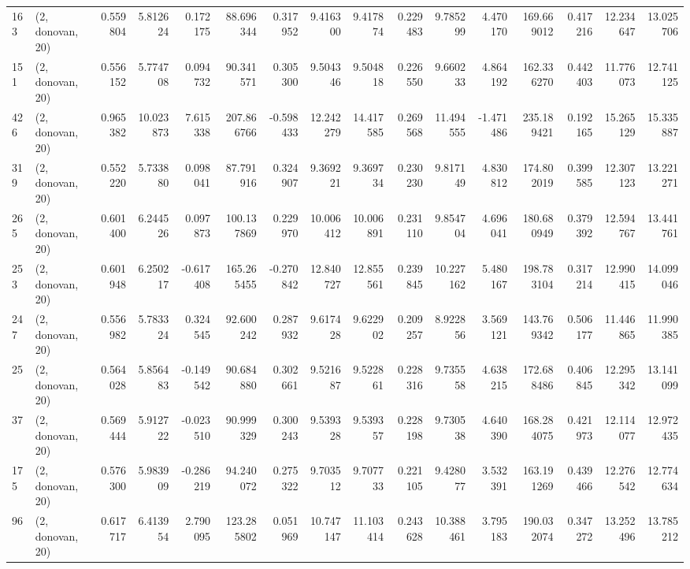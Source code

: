 \begin{tabular}{llrrrrrrrrrrrrrr}
163 &  (2, donovan, 20) &   0.559804 &   5.812624 &   0.172175 &    88.696344 &   0.317952 &   9.416300 &   9.417874 &  0.229483 &   9.785299 &   4.470170 &    169.669012 &   0.417216 &   12.234647 &   13.025706 \\
151 &  (2, donovan, 20) &   0.556152 &   5.774708 &   0.094732 &    90.341571 &   0.305300 &   9.504346 &   9.504818 &  0.226550 &   9.660233 &   4.864192 &    162.336270 &   0.442403 &   11.776073 &   12.741125 \\
426 &  (2, donovan, 20) &   0.965382 &  10.023873 &   7.615338 &   207.866766 &  -0.598433 &  12.242279 &  14.417585 &  0.269568 &  11.494555 &  -1.471486 &    235.189421 &   0.192165 &   15.265129 &   15.335887 \\
319 &  (2, donovan, 20) &   0.552220 &   5.733880 &   0.098041 &    87.791916 &   0.324907 &   9.369221 &   9.369734 &  0.230230 &   9.817149 &   4.830812 &    174.802019 &   0.399585 &   12.307123 &   13.221271 \\
265 &  (2, donovan, 20) &   0.601400 &   6.244526 &   0.097873 &   100.137869 &   0.229970 &  10.006412 &  10.006891 &  0.231110 &   9.854704 &   4.696041 &    180.680949 &   0.379392 &   12.594767 &   13.441761 \\
253 &  (2, donovan, 20) &   0.601948 &   6.250217 &  -0.617408 &   165.265455 &  -0.270842 &  12.840727 &  12.855561 &  0.239845 &  10.227162 &   5.480167 &    198.783104 &   0.317214 &   12.990415 &   14.099046 \\
247 &  (2, donovan, 20) &   0.556982 &   5.783324 &   0.324545 &    92.600242 &   0.287932 &   9.617428 &   9.622902 &  0.209257 &   8.922856 &   3.569121 &    143.769342 &   0.506177 &   11.446865 &   11.990385 \\
25  &  (2, donovan, 20) &   0.564028 &   5.856483 &  -0.149542 &    90.684880 &   0.302661 &   9.521687 &   9.522861 &  0.228316 &   9.735558 &   4.638215 &    172.688486 &   0.406845 &   12.295342 &   13.141099 \\
37  &  (2, donovan, 20) &   0.569444 &   5.912722 &  -0.023510 &    90.999329 &   0.300243 &   9.539328 &   9.539357 &  0.228198 &   9.730538 &   4.640390 &    168.284075 &   0.421973 &   12.114077 &   12.972435 \\
175 &  (2, donovan, 20) &   0.576300 &   5.983909 &  -0.286219 &    94.240072 &   0.275322 &   9.703512 &   9.707733 &  0.221105 &   9.428077 &   3.532391 &    163.191269 &   0.439466 &   12.276542 &   12.774634 \\
96  &  (2, donovan, 20) &   0.617717 &   6.413954 &   2.790095 &   123.285802 &   0.051969 &  10.747147 &  11.103414 &  0.243628 &  10.388461 &   3.795183 &    190.032074 &   0.347272 &   13.252496 &   13.785212 \\

\end{tabular}
